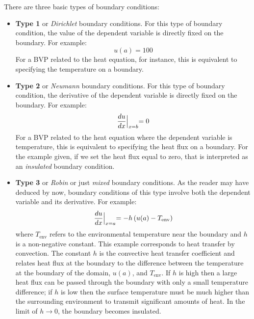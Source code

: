 There are three basic types of boundary conditions:
\begin{itemize}
\item \textbf{Type 1} or \emph{Dirichlet} boundary conditions.  For this type of boundary condition, the value of the dependent variable is directly fixed on the boundary.  For example:
\begin{equation*}
u(a) = 100
\end{equation*}
For a BVP related to the heat equation, for instance, this is equivalent to specifying the temperature on a boundary.
\item \textbf{Type 2} or \emph{Neumann} boundary conditions.  For this type of boundary condition, the derivative of the dependent variable is directly fixed on the boundary.  For example:
\begin{equation*}
\frac{du}{dx}\Bigl|_{x=b} = 0
\end{equation*}
For a BVP related to the heat equation where the dependent variable is temperature, this is equivalent to specifying the heat flux on a boundary.  For the example given, if we set the heat flux equal to zero, that is interpreted as an \emph{insulated} boundary condition.

\item \textbf{Type 3} or \emph{Robin} or just \emph{mixed} boundary conditions. As the reader may have deduced by now, boundary conditions of this type involve both the dependent variable and its derivative.  For example:
\begin{equation*}
\frac{du}{dx}\Bigl|_{x=a} = -h\left(u(a) - T_{\text{env}}\right)
\end{equation*} 
where $T_{\text{env}}$ refers to the environmental temperature near the boundary and $h$ is a non-negative constant. This example corresponds to heat transfer by convection.  The constant $h$ is the convective heat transfer coefficient and relates heat flux at the boundary to the difference between the temperature at the boundary of the domain, $u(a)$, and $T_{\text{env}}$.  If $h$ is high then a large heat flux can be passed through the boundary with only a small temperature difference; if $h$ is low then the surface temperature must be much higher than the surrounding environment to transmit significant amounts of heat.  In the limit of $h\to 0$, the boundary becomes insulated.

\end{itemize}

